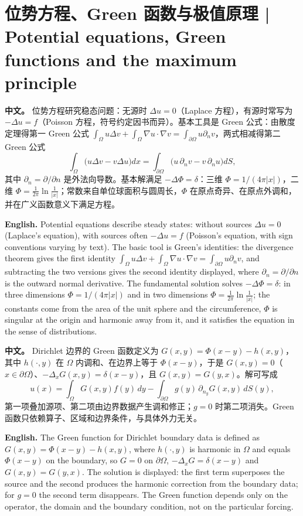 \documentclass[UTF8,11pt,a4paper]{ctexart}
\newcommand{\APS}[2]{\par\noindent\textbf{中文。} #1\par\noindent\textbf{English.} #2\par\smallskip}
\begin{document}
\section[位势方程与 Green 函数]{位势方程、Green 函数与极值原理 | Potential equations, Green functions and the maximum principle}
\APS{位势方程研究稳态问题：无源时 $\Delta u=0$（Laplace 方程），有源时常写为 $-\Delta u=f$（Poisson 方程，符号约定因书而异）。基本工具是 Green 公式：由散度定理得第一 Green 公式 $\int_\Omega u\Delta v+\int_\Omega\nabla u\cdot\nabla v=\int_{\partial\Omega}u\partial_nv$，两式相减得第二 Green 公式
\[
\int_\Omega\bigl(u\Delta v-v\Delta u\bigr)dx=\int_{\partial\Omega}\bigl(u\,\partial_nv-v\,\partial_nu\bigr)dS,
\]
其中 $\partial_n=\partial/\partial n$ 是外法向导数。基本解满足 $-\Delta\Phi=\delta$：三维 $\Phi=1/(4\pi|x|)$，二维 $\Phi=\frac1{2\pi}\ln\frac1{|x|}$；常数来自单位球面积与圆周长，$\Phi$ 在原点奇异、在原点外调和，并在广义函数意义下满足方程。}{Potential equations describe steady states: without sources $\Delta u=0$ (Laplace's equation), with sources often $-\Delta u=f$ (Poisson's equation, with sign conventions varying by text). The basic tool is Green's identities: the divergence theorem gives the first identity $\int_\Omega u\Delta v+\int_\Omega\nabla u\cdot\nabla v=\int_{\partial\Omega}u\partial_nv$, and subtracting the two versions gives the second identity displayed, where $\partial_n=\partial/\partial n$ is the outward normal derivative. The fundamental solution solves $-\Delta\Phi=\delta$: in three dimensions $\Phi=1/(4\pi|x|)$ and in two dimensions $\Phi=\frac1{2\pi}\ln\frac1{|x|}$; the constants come from the area of the unit sphere and the circumference, $\Phi$ is singular at the origin and harmonic away from it, and it satisfies the equation in the sense of distributions.}
\APS{Dirichlet 边界的 Green 函数定义为 $G(x,y)=\Phi(x-y)-h(x,y)$，其中 $h(\cdot,y)$ 在 $\Omega$ 内调和、在边界上等于 $\Phi(x-y)$，于是 $G(x,y)=0$（$x\in\partial\Omega$）、$-\Delta_xG(x,y)=\delta(x-y)$，且 $G(x,y)=G(y,x)$。解可写成
\[
u(x)=\int_\Omega G(x,y)f(y)\,dy-\int_{\partial\Omega}g(y)\,\partial_{n_y}G(x,y)\,dS(y),
\]
第一项叠加源项、第二项由边界数据产生调和修正；$g=0$ 时第二项消失。Green 函数只依赖算子、区域和边界条件，与具体外力无关。}{The Green function for Dirichlet boundary data is defined as $G(x,y)=\Phi(x-y)-h(x,y)$, where $h(\cdot,y)$ is harmonic in $\Omega$ and equals $\Phi(x-y)$ on the boundary, so $G=0$ on $\partial\Omega$, $-\Delta_xG=\delta(x-y)$ and $G(x,y)=G(y,x)$. The solution is displayed: the first term superposes the source and the second produces the harmonic correction from the boundary data; for $g=0$ the second term disappears. The Green function depends only on the operator, the domain and the boundary condition, not on the particular forcing.}
\end{document}

